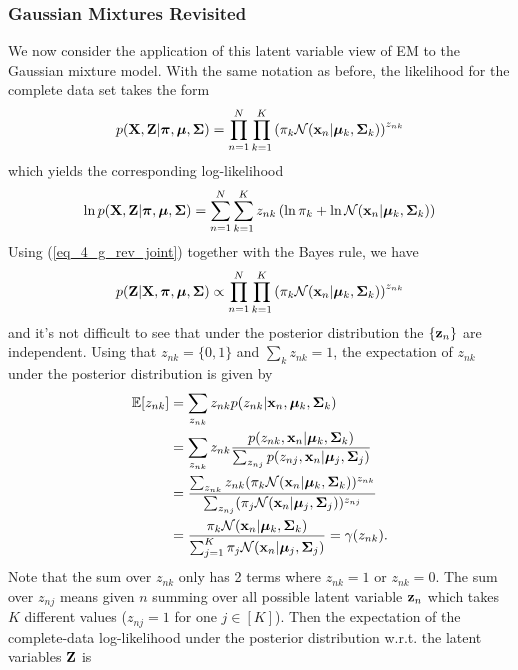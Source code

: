 \documentclass[../book-template.tex]{subfiles}
\begin{document}
\subsubsection{Gaussian Mixtures Revisited}
We now consider the application of this latent variable view of EM to the Gaussian mixture model. With the same notation as before, the likelihood for the complete data set takes the form
\begin{equation}\label{eq_4_g_rev_joint}
	p({\bf X,Z}|\bm{\pi},\bm{\mu},{\bf \Sigma}) = \prod_{n=1}^{N}\prod_{k=1}^{K} \left(\pi_k \mathcal{N}({\bf x}_n|\bm{\mu}_k,{\bf \Sigma}_k)\right)^{z_{nk}}
\end{equation}
which yields the corresponding log-likelihood
\begin{equation*}
	\ln p({\bf X,Z}|\bm{\pi},\bm{\mu},{\bf \Sigma}) = \sum_{n=1}^{N}\sum_{k=1}^{K} z_{nk}\left(\ln \pi_k +\ln \mathcal{N}({\bf x}_n|\bm{\mu}_k,{\bf \Sigma}_k)\right)
\end{equation*}
Using (\ref{eq_4_g_rev_joint}) together with the Bayes rule, we have
\begin{equation*}
	p({\bf Z}|{\bf X}, \bm{\pi},\bm{\mu},{\bf \Sigma}) \propto  \prod_{n=1}^{N}\prod_{k=1}^{K} \left(\pi_k \mathcal{N}({\bf x}_n|\bm{\mu}_k,{\bf \Sigma}_k)\right)^{z_{nk}}
\end{equation*}
and it's not difficult to see that under the posterior distribution the $\{{\bf z}_n\}$ are independent. Using that $z_{nk}=\{0,1\}$ and $\sum_k z_{nk}=1$, the expectation of $z_{nk}$ under the posterior distribution is given by
\begin{align*}
	\mathbb{E}[z_{nk}] &= \sum_{z_{nk}}z_{nk}p(z_{nk}|{\bf x}_n, \bm{\mu}_k, {\bf \Sigma}_k)\\
	&= \sum_{z_{nk}}z_{nk} \frac{p(z_{nk},{\bf x}_n|\bm{\mu}_k, {\bf \Sigma}_k)}{\sum_{z_{nj}}p(z_{nj},{\bf x}_n|\bm{\mu}_j, {\bf \Sigma}_j)}\\
	&= \frac{\sum_{z_{nk}}z_{nk}(\pi_k \mathcal{N}({\bf x}_n|\bm{\mu}_k,{\bf \Sigma}_k))^{z_{nk}}}{\sum_{z_{nj}}(\pi_j \mathcal{N}({\bf x}_n|\bm{\mu}_j,{\bf \Sigma}_j))^{z_{nj}}}\\
	&= \frac{\pi_k \mathcal{N}({\bf x}_n|\bm{\mu}_k,{\bf \Sigma}_k)}{\sum_{j=1}^{K}\pi_j \mathcal{N}({\bf x}_n|\bm{\mu}_j,{\bf \Sigma}_j)} = \gamma(z_{nk}).
\end{align*}
Note that the sum over $z_{nk}$ only has 2 terms where $z_{nk}=1$ or $z_{nk}=0$. The sum over $z_{nj}$ means given $n$ summing over all possible latent variable ${\bf z}_n$ which takes $K$ different values ($z_{nj}=1$ for one $j \in [K] $). Then the expectation of the complete-data log-likelihood under the posterior distribution w.r.t. the latent variables ${\bf Z}$ is
\end{document}
